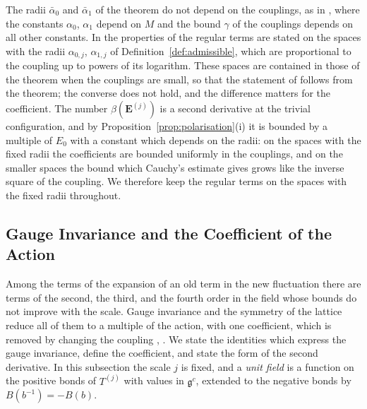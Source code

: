 \documentclass[11pt]{preprint}
\numberwithin{equation}{section}
\begin{document}
The radii $\bar\alpha_0$ and $\bar\alpha_1$ of the theorem do not depend on the couplings, as in \cite[Theorem~3]{BalabanRG1}, where the constants $\alpha_0$, $\alpha_1$ depend on $M$ and the bound $\gamma$ of the couplings depends on all other constants. In \cite[(2.26)--(2.28), p.~259]{BalabanCRE} the properties of the regular terms are stated on the spaces with the radii $\alpha_{0,j}$, $\alpha_{1,j}$ of Definition~\ref{def:admissible}, which are proportional to the coupling up to powers of its logarithm. These spaces are contained in those of the theorem when the couplings are small, so that the statement of \cite{BalabanCRE} follows from the theorem; the converse does not hold, and the difference matters for the coefficient. The number $\beta(\mathbf E^{(j)})$ is a second derivative at the trivial configuration, and by Proposition~\ref{prop:polarisation}(i) it is bounded by a multiple of $E_0$ with a constant which depends on the radii: on the spaces with the fixed radii the coefficients are bounded uniformly in the couplings, and on the smaller spaces the bound which Cauchy's estimate gives grows like the inverse square of the coupling. We therefore keep the regular terms on the spaces with the fixed radii throughout.

\subsection{Gauge Invariance and the Coefficient of the Action}\label{sec:coefficient}

Among the terms of the expansion of an old term in the new fluctuation there are terms of the second, the third, and the fourth order in the field whose bounds do not improve with the scale. Gauge invariance and the symmetry of the lattice reduce all of them to a multiple of the action, with one coefficient, which is removed by changing the coupling \cite[Sects.~4, 5]{BalabanRG1}, \cite[(3.49)--(3.67)]{BalabanCRE}. We state the identities which express the gauge invariance, define the coefficient, and state the form of the second derivative. In this subsection the scale $j$ is fixed, and a \emph{unit field} is a function on the positive bonds of $T^{(j)}$ with values in $\mathfrak g^c$, extended to the negative bonds by $B(b^{-1}) = -B(b)$.
\end{document}
